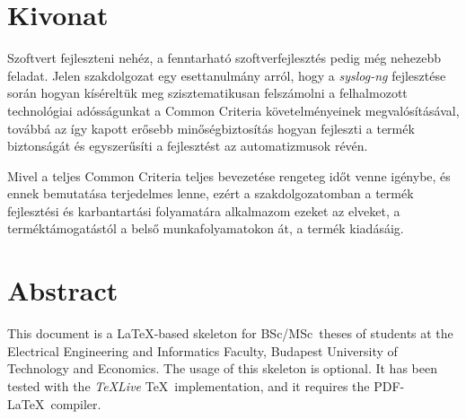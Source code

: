 \chapter*{Kivonat}

Szoftvert fejleszteni nehéz, a fenntarható szoftverfejlesztés pedig még nehezebb feladat.
Jelen szakdolgozat egy esettanulmány arról, hogy a \emph{syslog-ng} fejlesztése során hogyan
kíséreltük meg szisztematikusan felszámolni a felhalmozott technológiai adósságunkat a Common
Criteria követelményeinek megvalósításával, továbbá az így kapott erősebb minőségbiztosítás hogyan
fejleszti a termék biztonságát és egyszerűsíti a fejlesztést az automatizmusok révén.

Mivel a teljes Common Criteria teljes bevezetése rengeteg időt venne igénybe, és ennek bemutatása
terjedelmes lenne, ezért a szakdolgozatomban a termék fejlesztési és karbantartási folyamatára
alkalmazom ezeket az elveket, a terméktámogatástól a belső munkafolyamatokon át, a termék
kiadásáig.


\vfill

\chapter*{Abstract}

This document is a \LaTeX-based skeleton for BSc/MSc~theses of students at the Electrical
Engineering and Informatics Faculty, Budapest University of Technology and Economics. The usage of
this skeleton is optional. It has been tested with the \emph{TeXLive} \TeX~implementation, and it
requires the PDF-\LaTeX~compiler.
\vfill

